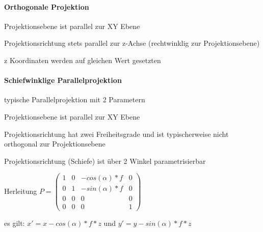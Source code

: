 \documentclass[landscape]{article}
\begin{document}
\begin{multicols}{3}
  \paragraph{Orthogonale Projektion}
  \begin{itemize*}
    \item Projektionsebene ist parallel zur XY Ebene
    \item Projektionsrichtung stets parallel zur z-Achse (rechtwinklig zur Projektionsebene)
    \item z Koordinaten werden auf gleichen Wert gesetzten
  \end{itemize*}
  
  \paragraph{Schiefwinklige Parallelprojektion}
  \begin{itemize*}
    \item typische Parallelprojektion mit 2 Parametern
    \item Projektionsebene ist parallel zur XY Ebene
    \item Projektionsrichtung hat zwei Freiheitsgrade und ist typischerweise nicht orthogonal zur Projektionsebene
    \item Projektionsrichtung (Schiefe) ist über 2 Winkel parametrisierbar
    \item Herleitung $P=\begin{pmatrix}
        1 & 0 & -cos(\alpha)*f & 0  \\
        0 & 1 & -sin(\alpha)*f & 0  \\
        0 & 0 & 0              & 0  \\
        0 & 0 & 0              & 1 
      \end{pmatrix}$
    \item es gilt: $x'=x-cos(\alpha)*f*z$ und $y'=y-sin(\alpha)*f*z$
  \end{itemize*}
  

\end{multicols}
\end{document}

